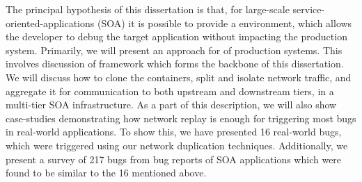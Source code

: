 \begin{comment}
Further, we look towards analysis for guided debugging in a live debugging environment as created in \parikshan.
We explain the debugging workflow from an end-to-end basis for an application debugger.
First we try and briefly answer how existing approaches can be used to localize the components that need to be cloned, using readily available log information.
We look into our earlier work called \textit{CLUE}\cite{clue} where we have explored systematically pointing potentially faulty components by looking at system call logs.
We also show other works, which look at existing available transaction and error logs, which can be used to find error traces, and localize buggy components.
Next, we explore the concept of \textit{debugging windows} in \parikshan, which signify the length of time till which the cloned containers faithfully follow the original production application.
We discuss how we can track, and predict the window sizes, and the amount of instrumentation budget that the debugger can employ, without causing a debug window collapse.
Finally, we look at new debugging analytics which can be used with \parikshan.
We take inspiration from existing work in adaptive statistical profiling, speculative and delta-debugging techniques to generate traces with good and bad behavior.
We show how automated debugging in \parikshan can greatly simplify the debugging process\
We also look into how to make applications \parikshan ready, by adding ready to instrument hooks in the application code.
In this context, we discuss \iprobe, a novel dynamic instrumentation technique, which allows for patching and instrumentation at runtime.
\iprobe has a significant performance advantage on existing techniques, which use interrupt based mechanisms to insert trampolines for instrumentation in the kernel code.
\end{comment}

The principal hypothesis of this dissertation is that, for large-scale service-oriented-applications (SOA) it is possible to provide a \livedebugging environment, which allows the developer to debug the target application without impacting the production system.
Primarily, we will present an approach for \livedebugging of production systems.
This involves discussion of \parikshan framework which forms the backbone of this dissertation.
We will discuss how to clone the containers, split and isolate network traffic, and aggregate it for communication to both upstream and downstream tiers, in a multi-tier SOA infrastructure.
As a part of this description, we will also show case-studies demonstrating how network replay is enough for triggering most bugs in real-world applications. 
To show this, we have presented 16 real-world bugs, which were triggered using our network duplication techniques. 
Additionally, we present a survey of 217 bugs from bug reports of SOA applications which were found to be similar to the 16 mentioned above.

